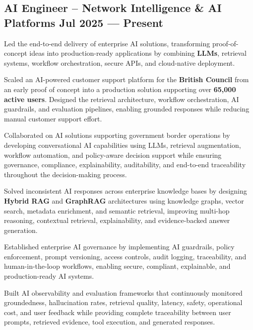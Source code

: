 
\subsection{{AI Engineer – Network Intelligence \& AI Platforms \hfill Jul 2025 --- Present}}
\begin{zitemize}

\item Led the end-to-end delivery of enterprise AI solutions, transforming proof-of-concept ideas into production-ready applications by combining \textbf{LLMs}, retrieval systems, workflow orchestration, secure APIs, and cloud-native deployment.

\item Scaled an AI-powered customer support platform for the \textbf{British Council} from an early proof of concept into a production solution supporting over \textbf{65,000 active users}. Designed the retrieval architecture, workflow orchestration, AI guardrails, and evaluation pipelines, enabling grounded responses while reducing manual customer support effort.

\item Collaborated on AI solutions supporting government border operations by developing conversational AI capabilities using LLMs, retrieval augmentation, workflow automation, and policy-aware decision support while ensuring governance, compliance, explainability, auditability, and end-to-end traceability throughout the decision-making process.

\item Solved inconsistent AI responses across enterprise knowledge bases by designing \textbf{Hybrid RAG} and \textbf{GraphRAG} architectures using knowledge graphs, vector search, metadata enrichment, and semantic retrieval, improving multi-hop reasoning, contextual retrieval, explainability, and evidence-backed answer generation.

\item Established enterprise AI governance by implementing AI guardrails, policy enforcement, prompt versioning, access controls, audit logging, traceability, and human-in-the-loop workflows, enabling secure, compliant, explainable, and production-ready AI systems.

\item Built AI observability and evaluation frameworks that continuously monitored groundedness, hallucination rates, retrieval quality, latency, safety, operational cost, and user feedback while providing complete traceability between user prompts, retrieved evidence, tool execution, and generated responses.


\end{zitemize}
